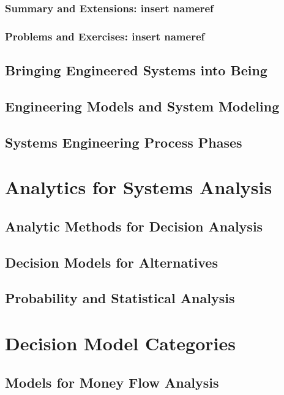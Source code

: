 \documentclass[11pt,fleqn]{book} %
\begin{document}
    \section{Summary and Extensions: insert nameref}
    \section{Problems and Exercises: insert nameref}
    
  \chapter{Bringing Engineered Systems into Being}
  
  \chapter{Engineering Models and System Modeling}
  
  \chapter{Systems Engineering Process Phases}
  
\part{Analytics for Systems Analysis}

  \chapter{Analytic Methods for Decision Analysis}
  
  \chapter{Decision Models for Alternatives}
  
  \chapter{Probability and Statistical Analysis}
  
\part{Decision Model Categories}

  \chapter{Models for Money Flow Analysis}
  
\end{document}
